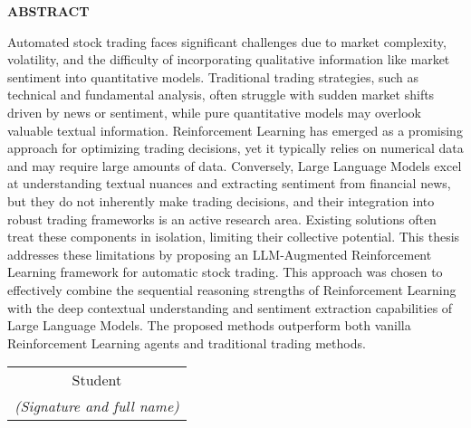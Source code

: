 \begin{center}
  \Large{\textbf{ABSTRACT}}\\
\end{center}
\vspace{1cm}
Automated stock trading faces significant challenges due to market complexity, volatility, and the difficulty of incorporating qualitative information like market sentiment into quantitative models. Traditional trading strategies, such as technical and fundamental analysis, often struggle with sudden market shifts driven by news or sentiment, while pure quantitative models may overlook valuable textual information. Reinforcement Learning has emerged as a promising approach for optimizing trading decisions, yet it typically relies on numerical data and may require large amounts of data. Conversely, Large Language Models excel at understanding textual nuances and extracting sentiment from financial news, but they do not inherently make trading decisions, and their integration into robust trading frameworks is an active research area. Existing solutions often treat these components in isolation, limiting their collective potential. This thesis addresses these limitations by proposing an LLM-Augmented Reinforcement Learning framework for automatic stock trading. This approach was chosen to effectively combine the sequential reasoning strengths of Reinforcement Learning with the deep contextual understanding and sentiment extraction capabilities of Large Language Models. The proposed methods outperform both vanilla Reinforcement Learning agents and traditional trading methods.
\begin{flushright}
  \begin{tabular}{@{}c@{}}
    Student\\
    \textit{(Signature and full name)}
  \end{tabular}
\end{flushright}
